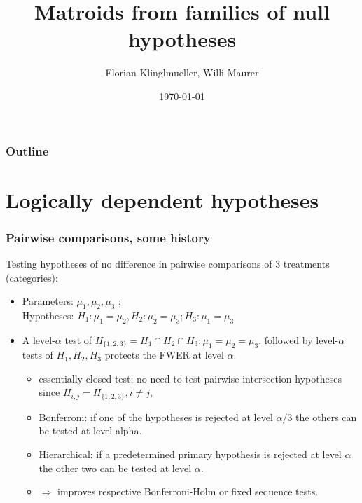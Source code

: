 \documentclass[bigger]{beamer}
\title{Matroids from families of null hypotheses}
\author{Florian Klinglmueller, Willi Maurer}
\date{\today}
\begin{document}
\maketitle



\begin{frame}
\frametitle{Outline}
\setcounter{tocdepth}{3}
\tableofcontents
\end{frame}




\section{Logically dependent hypotheses}


\begin{frame}
\frametitle{Pairwise comparisons, some history }

Testing hypotheses of no difference in pairwise comparisons of 3 treatments (categories):
\begin{itemize}
  \item Parameters: $\mu_1,\mu_2,\mu_3$ ; \\ Hypotheses: $H_1:\mu_1=\mu_2,H_2:\mu_2=\mu_3;H_3:\mu_1=\mu_3$
  \item A level-$\alpha$ test of $H_ {\{1,2,3\}} = H_1\cap H_2 \cap H_3 : \mu_1=\mu_2=\mu_3$. followed by level-$\alpha$ tests of $H_1,H_2,H_3$ protects the FWER at level $\alpha$.
  \begin{itemize}
    \item  essentially closed test; no need to test pairwise intersection hypotheses since $H_{{i,j}} = H_{\{1,2,3\}}, i\neq j$,
    \item  Bonferroni: if one of the hypotheses is rejected at level $\alpha/3$ the others can be tested at level alpha.
    \item  Hierarchical: if a predetermined primary hypothesis is rejected at level $\alpha$ the other two can be tested at level $\alpha$.
    \item  $\Rightarrow$ improves respective Bonferroni-Holm or fixed sequence tests.
  \end{itemize}
\end{itemize}
\end{frame}
\end{document}

